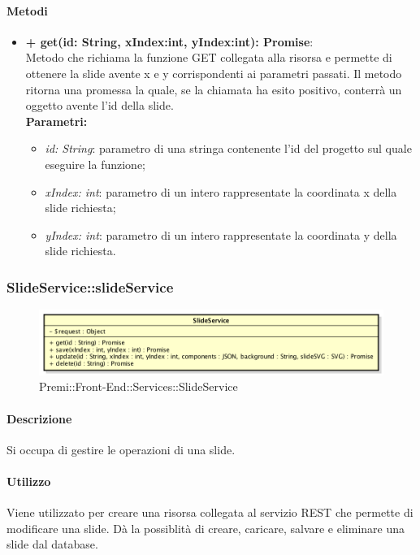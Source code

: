 		\paragraph{Metodi}
		\begin{itemize}
			\item \textbf{+ get(id: String, xIndex:int, yIndex:int): Promise}:\\
			Metodo che richiama la funzione GET collegata alla risorsa e permette di ottenere la \gls{slide} avente x e y corrispondenti ai parametri passati. Il metodo ritorna una promessa la quale, se la chiamata ha esito positivo, conterrà un oggetto avente l'id della \gls{slide}.\\
			\textbf{Parametri:}\\
			\begin{itemize}
				\item \textit{id: String}: parametro di una stringa contenente l'id del progetto sul quale eseguire la funzione;
				\item \textit{xIndex: int}: parametro di un intero rappresentate la coordinata x della \gls{slide} richiesta;
				\item \textit{yIndex: int}: parametro di un intero rappresentate la coordinata y della \gls{slide} richiesta.
			\end{itemize}
		\end{itemize}
\newpage
		
		\subsubsection{SlideService::slideService}
		\begin{figure}[h]
			\centering
				\includegraphics[width=0.5\linewidth]{img/premi_front_end_services_slideservice}
			\caption[Premi::Front-End::Services::SlideService]{Premi::Front-End::Services::SlideService}
		\end{figure}
		
		\paragraph{Descrizione}
		Si occupa di gestire le operazioni di una \gls{slide}.
		
		\paragraph{Utilizzo}
		Viene utilizzato per creare una risorsa collegata al servizio \gls{REST} che permette di modificare una \gls{slide}. Dà la possiblità di creare, caricare, salvare e eliminare una \gls{slide} dal \gls{database}.
		
